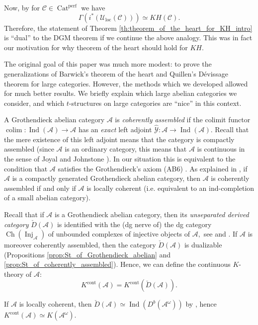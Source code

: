 \documentclass[11pt,leqno]{amsart}
\numberwithin{equation}{section}
\DeclareMathOperator*{\colim}{colim}
\newcommand{\Ch}{\operatorname{Ch}}
\newcommand{\Inj}{\operatorname{Inj}}
\newcommand{\Cat}{\operatorname{Cat}}
\newcommand{\loc}{\operatorname{loc}}
\newcommand{\cont}{\operatorname{cont}}
\newcommand{\cA}{{\mathcal A}}
\newcommand{\cC}{{\mathcal C}}
\newcommand{\cY}{{\mathcal Y}}
\newcommand{\cU}{{\mathcal U}}
\newcommand{\perf}{\operatorname{perf}}
\newcommand{\Ind}{\operatorname{Ind}}
\begin{document}
Now, by \cite[Corollary 8.3]{E25c} for $\cC\in\Cat^{\perf}$ we have 
\begin{equation*}
\Gamma(i^*(\cU_{\loc}(\cC)))\simeq KH(\cC).
\end{equation*} Therefore, the statement of Theorem \ref{th:theorem_of_the_heart_for_KH_intro} is ``dual'' to the DGM theorem if we continue the above analogy. This was in fact our motivation for why theorem of the heart should hold for $KH.$

The original goal of this paper was much more modest: to prove the generalizations of Barwick's theorem of the heart \cite[Theorem 6.1]{Bar15} and Quillen's D\'evissage theorem \cite[Theorem 4]{Qui73} for large categories. However, the methods which we developed allowed for much better results. We briefly explain which large abelian categories we consider, and which $t$-structures on large categories are ``nice'' in this context.

A Grothendieck abelian category $\cA$ is {\it coherently assembled} if the colimit functor $\colim:\Ind(\cA)\to\cA$ has an {\it exact} left adjoint $\hat{\cY}:\cA\to\Ind(\cA).$ Recall that the mere existence of this left adjoint means that the category is compactly assembled \cite[Definition 21.1.2.1]{Lur18} (since $\cA$ is an ordinary category, this means that $\cA$ is continuous in the sense of Joyal and Johnstone \cite{JJ}). In our situation this is equivalent to the condition that $\cA$ satisfies the Grothendieck's axiom (AB6) \cite{Gro}. As explained in \cite[Proposition E.8]{E24}, if $\cA$ is a compactly generated Grothendieck abelian category, then $\cA$ is coherently assembled if and only if $\cA$ is locally coherent (i.e. equivalent to an ind-completion of a small abelian category).

Recall that if $\cA$ is a Grothendieck abelian category, then its {\it unseparated derived category} $\check{D}(\cA)$ is identified with the (dg nerve of) the dg category $\Ch(\Inj_{\cA})$ of unbounded complexes of injective objects of $\cA,$ see \cite{Kr05, Kr15} and \cite[Section C.5.8]{Lur18}. If $\cA$ is moreover coherently assembled, then the category $\check{D}(\cA)$ is dualizable (Propositions \ref{prop:St_of_Grothendieck_abelian} and \ref{prop:St_of_coherently_assembled}). Hence, we can define the continuous $K$-theory of $\cA:$
\begin{equation*}
K^{\cont}(\cA)=K^{\cont}(\check{D}(\cA)).
\end{equation*}

If $\cA$ is locally coherent, then $\check{D}(\cA)\simeq\Ind(D^b(\cA^{\omega}))$ by \cite[Theorem 4.9]{Kr15}, hence $K^{\cont}(\cA)\simeq K(\cA^{\omega}).$ 
\end{document}
